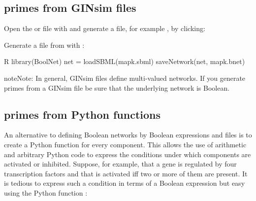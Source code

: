 \documentclass[letterpaper,10pt,english]{sphinxmanual}
\begin{document}
\subsection{primes from GINsim files}
\label{\detokenize{Manual:primes-from-ginsim-files}}\label{\detokenize{Manual:id2}}
Open the  or  file with {\hyperref[\detokenize{Installation:installation-ginsim}]{}} and generate a  file, for example , by clicking:

\begin{sphinxVerbatim}[commandchars=\\\{\}]
      
\end{sphinxVerbatim}

Generate a  file from  with {\hyperref[\detokenize{Installation:installation-boolnet}]{}}:

\begin{sphinxVerbatim}[commandchars=\\\{\}]
\PYGZdl{} R
\PYGZgt{} library(BoolNet)
\PYGZgt{} net = loadSBML(\PYGZdq{}mapk.sbml\PYGZdq{})
\PYGZgt{} saveNetwork(net, \PYGZdq{}mapk.bnet\PYGZdq{})
\end{sphinxVerbatim}

\begin{sphinxadmonition}{note}{Note:}
In general, GINsim files define multi-valued networks. If you generate primes from a GINsim file be sure that the underlying network is Boolean.
\end{sphinxadmonition}


\subsection{primes from Python functions}
\label{\detokenize{Manual:primes-from-python-functions}}\label{\detokenize{Manual:id3}}
An alternative to defining Boolean networks by Boolean expressions and  files is to create a Python function for every component.
This allows the use of arithmetic and arbitrary Python code to express the conditions under which components are activated or inhibited.
Suppose, for example, that a gene  is regulated by four transcription factors  and that  is activated iff two or more of them are present.
It is tedious to express such a condition in terms of a Boolean expression but easy using the Python function :
\end{document}
